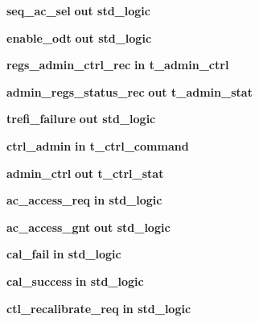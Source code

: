 \begin{DoxyCompactItemize}
\item 
{\bf seq\+\_\+ac\+\_\+sel}  {\bfseries {\bfseries \textcolor{keywordflow}{out}\textcolor{vhdlchar}{ }}} {\bfseries \textcolor{comment}{std\+\_\+logic}\textcolor{vhdlchar}{ }} 
\item 
{\bf enable\+\_\+odt}  {\bfseries {\bfseries \textcolor{keywordflow}{out}\textcolor{vhdlchar}{ }}} {\bfseries \textcolor{comment}{std\+\_\+logic}\textcolor{vhdlchar}{ }} 
\item 
{\bf regs\+\_\+admin\+\_\+ctrl\+\_\+rec}  {\bfseries {\bfseries \textcolor{keywordflow}{in}\textcolor{vhdlchar}{ }}} {\bfseries {\bfseries {\bf t\+\_\+admin\+\_\+ctrl}} \textcolor{vhdlchar}{ }} 
\item 
{\bf admin\+\_\+regs\+\_\+status\+\_\+rec}  {\bfseries {\bfseries \textcolor{keywordflow}{out}\textcolor{vhdlchar}{ }}} {\bfseries {\bfseries {\bf t\+\_\+admin\+\_\+stat}} \textcolor{vhdlchar}{ }} 
\item 
{\bf trefi\+\_\+failure}  {\bfseries {\bfseries \textcolor{keywordflow}{out}\textcolor{vhdlchar}{ }}} {\bfseries \textcolor{comment}{std\+\_\+logic}\textcolor{vhdlchar}{ }} 
\item 
{\bf ctrl\+\_\+admin}  {\bfseries {\bfseries \textcolor{keywordflow}{in}\textcolor{vhdlchar}{ }}} {\bfseries {\bfseries {\bf t\+\_\+ctrl\+\_\+command}} \textcolor{vhdlchar}{ }} 
\item 
{\bf admin\+\_\+ctrl}  {\bfseries {\bfseries \textcolor{keywordflow}{out}\textcolor{vhdlchar}{ }}} {\bfseries {\bfseries {\bf t\+\_\+ctrl\+\_\+stat}} \textcolor{vhdlchar}{ }} 
\item 
{\bf ac\+\_\+access\+\_\+req}  {\bfseries {\bfseries \textcolor{keywordflow}{in}\textcolor{vhdlchar}{ }}} {\bfseries \textcolor{comment}{std\+\_\+logic}\textcolor{vhdlchar}{ }} 
\item 
{\bf ac\+\_\+access\+\_\+gnt}  {\bfseries {\bfseries \textcolor{keywordflow}{out}\textcolor{vhdlchar}{ }}} {\bfseries \textcolor{comment}{std\+\_\+logic}\textcolor{vhdlchar}{ }} 
\item 
{\bf cal\+\_\+fail}  {\bfseries {\bfseries \textcolor{keywordflow}{in}\textcolor{vhdlchar}{ }}} {\bfseries \textcolor{comment}{std\+\_\+logic}\textcolor{vhdlchar}{ }} 
\item 
{\bf cal\+\_\+success}  {\bfseries {\bfseries \textcolor{keywordflow}{in}\textcolor{vhdlchar}{ }}} {\bfseries \textcolor{comment}{std\+\_\+logic}\textcolor{vhdlchar}{ }} 
\item 
{\bf ctl\+\_\+recalibrate\+\_\+req}  {\bfseries {\bfseries \textcolor{keywordflow}{in}\textcolor{vhdlchar}{ }}} {\bfseries \textcolor{comment}{std\+\_\+logic}\textcolor{vhdlchar}{ }} 
\end{DoxyCompactItemize}


